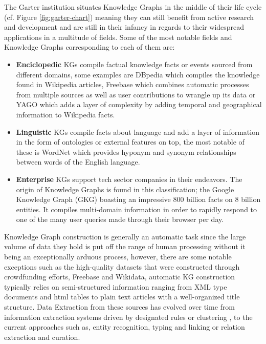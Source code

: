 The Garter institution situates Knowledge Graphs in the middle of their life cycle (cf. Figure \ref{fig:garter-chart}) meaning they can still benefit from active research and development and are still in their infancy in regards to their widespread applications in a multitude of fields. Some of the most notable fields and Knowledge Graphs corresponding to each of them are:
\begin{itemize}
    \item \textbf{Enciclopedic} KGs compile factual knowledge facts or events sourced from different domains, some examples are DBpedia\cite{auer2007dbpedia} which compiles the knowledge found in Wikipedia articles, Freebase\cite{bollacker2007freebase} which combines automatic processes from multiple sources as well as user contributions to wrangle up its data or YAGO\cite{suchanek2007yago} which adds a layer of complexity by adding temporal and geographical information to Wikipedia facts.
    \item \textbf{Linguistic} KGs compile facts about language and add a layer of information in the form of ontologies or external features on top, the most notable of these is WordNet\cite{miller1995wordnet} which provides hyponym and synonym relationships between words of the English language.
    \item \textbf{Enterprise} KGs support tech sector companies in their endeavors. The origin of Knowledge Graphs is found in this classification; the Google Knowledge Graph (GKG) \cite{steiner2012adding} boasting an impressive 800 billion facts on 8 billion entities. It compiles multi-domain information in order to rapidly respond to one of the many user queries made through their browser per day. 
\end{itemize}

Knowledge Graph construction is generally an automatic task since the large volume of data they hold is put off the range of human processing without it being an exceptionally arduous process, however, there are some notable exceptions such as the high-quality datasets that were constructed through crowdfunding efforts, Freebase\cite{bollacker2007freebase} and Wikidata\cite{vrandevcic2014wikidata}, automatic KG construction typically relies on semi-structured\cite{lehmann2015dbpedia} information ranging from XML type documents and html tables to plain text articles with a well-organized title structure.
Data Extraction from these sources has evolved over time from information extraction systems driven by designated rules or clustering \cite{yates2007textrunner, etzioni2004web}, to the current approaches such as, entity recognition\cite{huang2015bidirectional, ma2016end}, typing\cite{xu2018neural, ren2016label} and linking\cite{ganea2017deep, le2018improving} or relation extraction and curation\cite{zeng2015distant, zhou2016attention}. 

